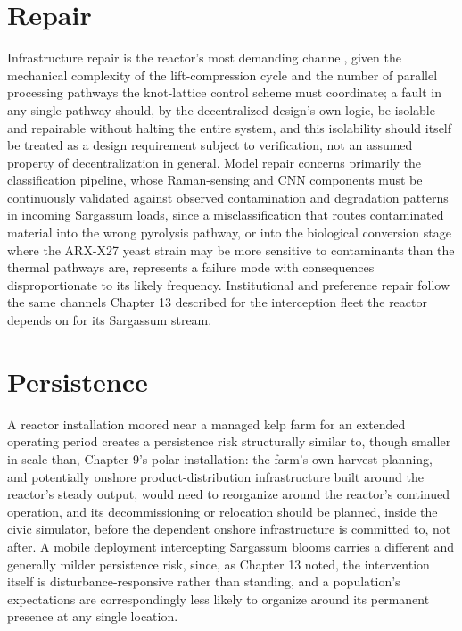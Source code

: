 \documentclass[11pt,oneside]{book}
\begin{document}
\section*{Repair}

Infrastructure repair is the reactor's most demanding channel, given the mechanical complexity of the lift-compression cycle and the number of parallel processing pathways the knot-lattice control scheme must coordinate; a fault in any single pathway should, by the decentralized design's own logic, be isolable and repairable without halting the entire system, and this isolability should itself be treated as a design requirement subject to verification, not an assumed property of decentralization in general. Model repair concerns primarily the classification pipeline, whose Raman-sensing and CNN components must be continuously validated against observed contamination and degradation patterns in incoming Sargassum loads, since a misclassification that routes contaminated material into the wrong pyrolysis pathway, or into the biological conversion stage where the ARX-X27 yeast strain may be more sensitive to contaminants than the thermal pathways are, represents a failure mode with consequences disproportionate to its likely frequency. Institutional and preference repair follow the same channels Chapter 13 described for the interception fleet the reactor depends on for its Sargassum stream.

\section*{Persistence}

A reactor installation moored near a managed kelp farm for an extended operating period creates a persistence risk structurally similar to, though smaller in scale than, Chapter 9's polar installation: the farm's own harvest planning, and potentially onshore product-distribution infrastructure built around the reactor's steady output, would need to reorganize around the reactor's continued operation, and its decommissioning or relocation should be planned, inside the civic simulator, before the dependent onshore infrastructure is committed to, not after. A mobile deployment intercepting Sargassum blooms carries a different and generally milder persistence risk, since, as Chapter 13 noted, the intervention itself is disturbance-responsive rather than standing, and a population's expectations are correspondingly less likely to organize around its permanent presence at any single location.
\end{document}
